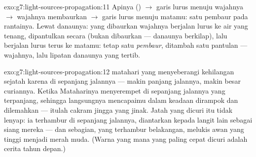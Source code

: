\begin{solution}{exo:g7:light-sources-propagation:11}
Apinya () $\to$ garis lurus menuju wajahnya $\to$
wajahnya membaurkan $\to$ garis lurus menuju matamu: satu pembaur pada
rantainya. Lewat danaunya:  yang dibaurkan wajahnya berjalan
lurus ke air yang tenang, dipantulkan secara  (bukan dibaurkan
--- danaunya berkilap), lalu berjalan lurus terus ke matamu: tetap
satu \emph{pembaur}, ditambah satu pantulan  --- wajahnya, lalu
lipatan danaunya yang tertib.
\end{solution}

\begin{solution}{exo:g7:light-sources-propagation:12}
 matahari yang menyeberangi  kehilangan sejatah karena
 di sepanjang jalannya --- makin panjang jalannya, makin besar
curiannya. Ketika   Mataharinya menyerempet
 di sepanjang jalannya yang terpanjang, sehingga 
langsungnya mencapaimu dalam keadaan dirampok dan dilemahkan --- itulah
cakram jingga yang jinak. Jatah yang dicuri itu tidak lenyap: ia
terhambur di sepanjang jalannya, diantarkan kepada langit lain sebagai
 siang mereka --- dan sebagian, yang terhambur belakangan,
melukis awan yang tinggi menjadi merah muda. (Warna yang mana yang
paling cepat dicuri adalah cerita tahun depan.)
\end{solution}

